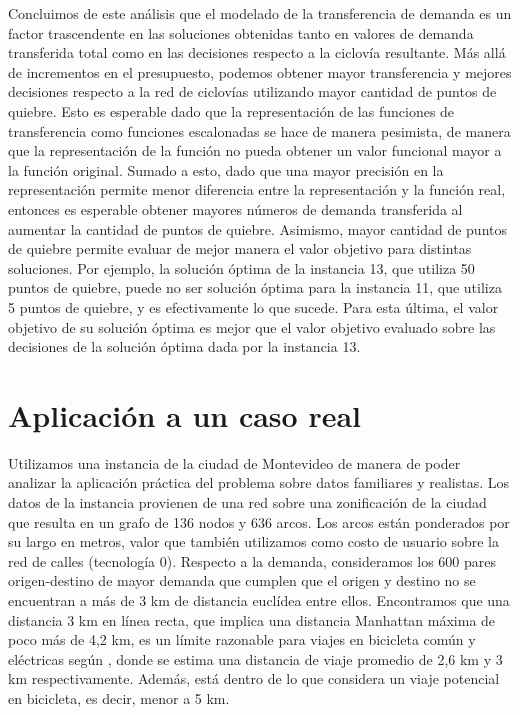 \clearpage
Concluimos de este análisis que el modelado de la transferencia de demanda es un factor trascendente en las soluciones obtenidas tanto en valores de demanda transferida total como en las decisiones respecto a la ciclovía resultante. Más allá de incrementos en el presupuesto, podemos obtener mayor transferencia y mejores decisiones respecto a la red de ciclovías utilizando mayor cantidad de puntos de quiebre. Esto es esperable dado que la representación de las funciones de transferencia como funciones escalonadas se hace de manera pesimista, de manera que la representación de la función no pueda obtener un valor funcional mayor a la función original. Sumado a esto, dado que una mayor precisión en la representación permite menor diferencia entre la representación y la función real, entonces es esperable obtener mayores números de demanda transferida al aumentar la cantidad de puntos de quiebre. Asimismo, mayor cantidad de puntos de quiebre permite evaluar de mejor manera el valor objetivo para distintas soluciones. Por ejemplo, la solución óptima de la instancia 13, que utiliza 50 puntos de quiebre, puede no ser solución óptima para la instancia 11, que utiliza 5 puntos de quiebre, y es efectivamente lo que sucede. Para esta última, el valor objetivo de su solución óptima es mejor que el valor objetivo evaluado sobre las decisiones de la solución óptima dada por la instancia 13.

\FloatBarrier
\section{Aplicación a un caso real}

Utilizamos una instancia de la ciudad de Montevideo de manera de poder analizar la aplicación práctica del problema sobre datos familiares y realistas. Los datos de la instancia provienen de una red sobre una zonificación de la ciudad que resulta en un grafo de 136 nodos y 636 arcos. Los arcos están ponderados por su largo en metros, valor que también utilizamos como costo de usuario sobre la red de calles (tecnología 0). Respecto a la demanda, consideramos los 600 pares origen-destino de mayor demanda que cumplen que el origen y destino no se encuentran a más de 3 km de distancia euclídea entre ellos. Encontramos que una distancia 3 km en línea recta, que implica una distancia Manhattan máxima de poco más de 4,2 km, es un límite razonable para viajes en bicicleta común y eléctricas según \textcite{anette2018}, donde se estima una distancia de viaje promedio de 2,6 km y 3 km respectivamente. Además, está dentro de lo que \textcite{shwe2014} considera un viaje potencial en bicicleta, es decir, menor a 5 km.

